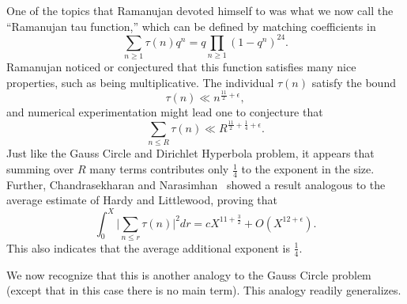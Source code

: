 One of the topics that Ramanujan devoted himself to was what we now call the ``Ramanujan
tau function,''
which can be defined by matching coefficients in
\begin{equation}
  \sum_{n \geq 1} \tau(n) q^n = q \prod_{n \geq 1} (1 - q^n)^{24}.
\end{equation}
Ramanujan noticed or conjectured that this function satisfies many nice properties,
such as being multiplicative.
The individual $\tau(n)$ satisfy the bound
\begin{equation}
  \tau(n) \ll n^{\frac{11}{2} + \epsilon},
\end{equation}
and numerical experimentation might lead one to conjecture that
\begin{equation}
  \sum_{n \leq R} \tau(n) \ll R^{\frac{11}{2} + \frac{1}{4} + \epsilon}.
\end{equation}
Just like the Gauss Circle and Dirichlet Hyperbola problem, it appears that summing over
$R$ many terms contributes only $\frac{1}{4}$ to the exponent in the size.
Further, Chandrasekharan and Narasimhan~\cite{chandrasekharan1962functional,
chandrasekharan1964mean} showed a result analogous to the average estimate of Hardy and
Littlewood, proving that
\begin{equation}
  \int_0^X \big\lvert \sum_{n \leq r} \tau(n) \big\rvert^2 dr = c X^{11 + \frac{3}{2}} + O(X^{12 +
  \epsilon}).
\end{equation}
This also indicates that the average additional exponent is $\frac{1}{4}$.



We now recognize that this is another analogy to the Gauss Circle problem (except that in
this case there is no main term).
This analogy readily generalizes.


